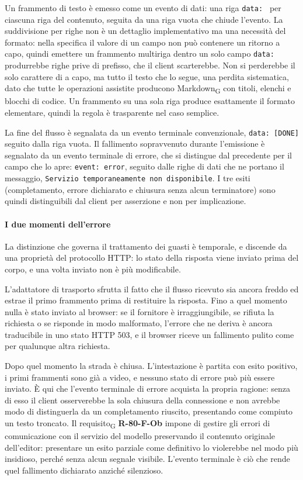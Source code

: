 \documentclass[a4paper, 10pt]{article}
\begin{document}
Un frammento di testo è emesso come un evento di dati: una riga \texttt{data:\ } per ciascuna riga del contenuto, seguita da una riga vuota che chiude l'evento. La suddivisione per righe non è un dettaglio implementativo ma una necessità del formato: nella specifica il valore di un campo non può contenere un ritorno a capo, quindi emettere un frammento multiriga dentro un solo campo \texttt{data:} produrrebbe righe prive di prefisso, che il client scarterebbe. Non si perderebbe il solo carattere di a capo, ma tutto il testo che lo segue, una perdita sistematica, dato che tutte le operazioni assistite producono Markdown\textsubscript{G} con titoli, elenchi e blocchi di codice. Un frammento su una sola riga produce esattamente il formato elementare, quindi la regola è trasparente nel caso semplice.

La fine del flusso è segnalata da un evento terminale convenzionale, \texttt{data: [DONE]} seguito dalla riga vuota. Il fallimento sopravvenuto durante l'emissione è segnalato da un evento terminale di errore, che si distingue dal precedente per il campo che lo apre: \texttt{event: error}, seguito dalle righe di dati che ne portano il messaggio, \texttt{Servizio temporaneamente non disponibile}. I tre esiti (completamento, errore dichiarato e chiusura senza alcun terminatore) sono quindi distinguibili dal client per asserzione e non per implicazione.

\paragraph{I due momenti dell'errore}
La distinzione che governa il trattamento dei guasti è temporale, e discende da una proprietà del protocollo HTTP: lo stato della risposta viene inviato prima del corpo, e una volta inviato non è più modificabile.

L'adattatore di trasporto sfrutta il fatto che il flusso ricevuto sia ancora freddo ed estrae il primo frammento prima di restituire la risposta. Fino a quel momento nulla è stato inviato al browser: se il fornitore è irraggiungibile, se rifiuta la richiesta o se risponde in modo malformato, l'errore che ne deriva è ancora traducibile in uno stato HTTP 503, e il browser riceve un fallimento pulito come per qualunque altra richiesta.

Dopo quel momento la strada è chiusa. L'intestazione è partita con esito positivo, i primi frammenti sono già a video, e nessuno stato di errore può più essere inviato. È qui che l'evento terminale di errore acquista la propria ragione: senza di esso il client osserverebbe la sola chiusura della connessione e non avrebbe modo di distinguerla da un completamento riuscito, presentando come compiuto un testo troncato. Il requisito\textsubscript{G} \textbf{R-80-F-Ob} impone di gestire gli errori di comunicazione con il servizio del modello preservando il contenuto originale dell'editor: presentare un esito parziale come definitivo lo violerebbe nel modo più insidioso, perché senza alcun segnale visibile. L'evento terminale è ciò che rende quel fallimento dichiarato anziché silenzioso.
\end{document}
